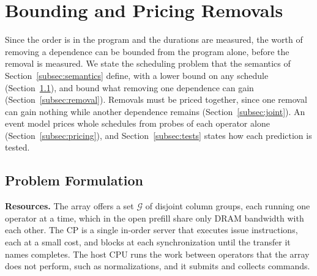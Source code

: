 \section{Bounding and Pricing Removals}
\label{sec:bound}

Since the order is in the program and the durations are measured, the worth of removing a dependence can be bounded from the program alone, before the removal is measured.
We state the scheduling problem that the semantics of Section~\ref{subsec:semantics} define, with a lower bound on any schedule (Section~\ref{subsec:formulation}), and bound what removing one dependence can gain (Section~\ref{subsec:removal}).
Removals must be priced together, since one removal can gain nothing while another dependence remains (Section~\ref{subsec:joint}).
An event model prices whole schedules from probes of each operator alone (Section~\ref{subsec:pricing}), and Section~\ref{subsec:tests} states how each prediction is tested.

\subsection{Problem Formulation}
\label{subsec:formulation}

\textbf{Resources.}
The array offers a set $\mathcal{G}$ of disjoint column groups, each running one operator at a time, which in the open prefill share only DRAM bandwidth with each other.
The CP is a single in-order server that executes issue instructions, each at a small cost, and blocks at each synchronization until the transfer it names completes.
The host CPU runs the work between operators that the array does not perform, such as normalizations, and it submits and collects commands.


